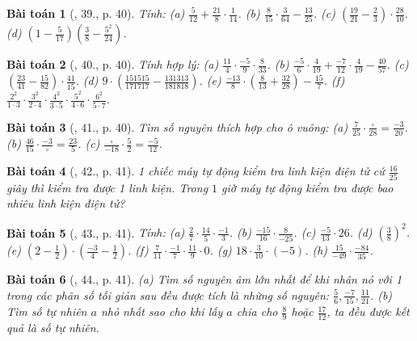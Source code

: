 \documentclass{article}
\newtheorem{baitoan}{Bài toán}
\begin{document}
\begin{baitoan}[\cite{SBT_Toan_6_Canh_Dieu_tap_2}, 39., p. 40]
	Tính: (a) $\frac{5}{12} + \frac{21}{8}\cdot\frac{1}{14}$. (b) $\frac{8}{15}\cdot\frac{3}{64} - \frac{13}{25}$. (c) $\left(\frac{19}{21} - \frac{2}{3}\right)\cdot\frac{28}{10}$. (d) $\left(1 - \frac{5}{17}\right)\left(\frac{3}{8} - \frac{5^2}{24}\right)$.
\end{baitoan}

\begin{baitoan}[\cite{SBT_Toan_6_Canh_Dieu_tap_2}, 40., p. 40]
	Tính hợp lý: (a) $\frac{11}{4}\cdot\frac{-5}{9}\cdot\frac{8}{33}$. (b) $\frac{-5}{6}\cdot\frac{4}{19} + \frac{-7}{12}\cdot\frac{4}{19} - \frac{40}{57}$. (c) $\left(\frac{23}{41} - \frac{15}{82}\right)\cdot\frac{41}{15}$. (d) $9\cdot\left(\frac{151515}{171717} - \frac{131313}{181818}\right)$. (e) $\frac{-13}{8}\cdot\left(\frac{8}{13} + \frac{32}{28}\right) - \frac{15}{7}$. (f) $\frac{2^2}{1\cdot3}\cdot\frac{3^2}{2\cdot4}\cdot\frac{4^2}{3\cdot5}\cdot\frac{5^2}{4\cdot6}\cdot\frac{6^2}{5\cdot7}$.
\end{baitoan}

\begin{baitoan}[\cite{SBT_Toan_6_Canh_Dieu_tap_2}, 41., p. 40]
	Tìm số nguyên thích hợp cho ô vuông: (a) $\frac{7}{25}\cdot\frac{\square}{28} = \frac{-3}{20}$. (b) $\frac{46}{15}\cdot\frac{-3}{\square} = \frac{23}{5}$. (c) $\frac{\square}{-18}\cdot\frac{5}{2} = \frac{-5}{12}$.
\end{baitoan}

\begin{baitoan}[\cite{SBT_Toan_6_Canh_Dieu_tap_2}, 42., p. 41]
	1 chiếc máy tự động kiểm tra linh kiện điện tử cứ $\frac{16}{25}$ giây thì kiểm tra được 1 linh kiện. Trong $1$ giờ máy tự động kiểm tra được bao nhiêu linh kiện điện tử?
\end{baitoan}

\begin{baitoan}[\cite{SBT_Toan_6_Canh_Dieu_tap_2}, 43., p. 41]
	Tính: (a) $\frac{2}{7}\cdot\frac{14}{5}\cdot\frac{-1}{3}$. (b) $\frac{-15}{16}\cdot\frac{8}{-25}$. (c) $\frac{-5}{13}\cdot26$. (d) $\left(\frac{3}{8}\right)^2$. (e) $\left(2 - \frac{1}{2}\right)\cdot\left(\frac{-3}{4} - \frac{1}{2}\right)$. (f) $\frac{7}{11}\cdot\frac{-1}{7}\cdot\frac{11}{9}\cdot0$. (g) $18\cdot\frac{3}{10}\cdot(-5)$. (h) $\frac{15}{-49}\cdot\frac{-84}{35}$.
\end{baitoan}

\begin{baitoan}[\cite{SBT_Toan_6_Canh_Dieu_tap_2}, 44., p. 41]
	(a) Tìm số nguyên âm lớn nhất để khi nhân nó với 1 trong các phân số tối giản sau đều được tích là những số nguyên: $\frac{5}{6},\frac{-7}{15},\frac{11}{21}$. (b) Tìm số tự nhiên $a$ nhỏ nhất sao cho khi lấy $a$ chia cho $\frac{8}{9}$ hoặc $\frac{17}{12}$, ta đều được kết quả là số tự nhiên.
\end{baitoan}
\end{document}
